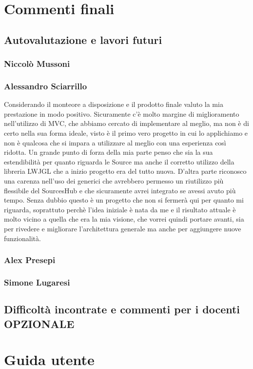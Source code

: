 \documentclass[a4paper,12pt]{report}
\begin{document}
\chapter{Commenti finali}
\section{Autovalutazione e lavori futuri}
\subsection*{Niccolò Mussoni}
\subsection*{Alessandro Sciarrillo}
Considerando il monteore a disposizione e il prodotto finale valuto la mia prestazione in modo positivo.
Sicuramente c'è molto margine di miglioramento nell'utilizzo di MVC, che abbiamo cercato di implementare al meglio, ma non è di certo nella sua forma ideale, visto è il primo vero progetto in cui lo applichiamo e non è qualcosa che si impara a utilizzare al meglio con una esperienza così ridotta. Un grande punto di forza della mia parte penso che sia la sua estendibilità per quanto riguarda le Source ma anche il corretto utilizzo della libreria LWJGL che a inizio progetto era del tutto nuova. D'altra parte riconosco una carenza nell'uso dei generici che avrebbero permesso un riutilizzo più flessibile del SourcesHub e che sicuramente avrei integrato se avessi avuto più tempo.
Senza dubbio questo è un progetto che non si fermerà qui per quanto mi riguarda, soprattuto perchè l'idea iniziale è nata da me e il risultato attuale è molto vicino a quella che era la mia visione, che vorrei quindi portare avanti, sia per rivedere e migliorare l'architettura generale ma anche per aggiungere nuove funzionalità.
\subsection*{Alex Presepi}
\subsection*{Simone Lugaresi}

\section{Difficoltà incontrate e commenti per i docenti OPZIONALE}

\appendix
\chapter{Guida utente}
\end{document}
